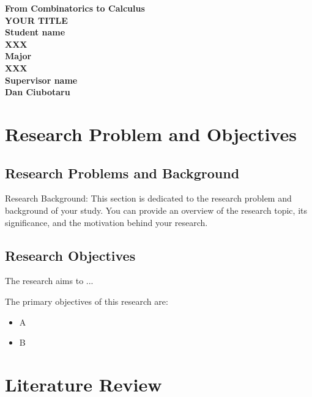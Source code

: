 \documentclass[12pt]{article}
\begin{document}
\begin{titlepage}
    \begin{center}
        \vspace*{3cm}

        \textbf{\Large From Combinatorics to Calculus}\\[2.5cm]

        \textbf{\Large YOUR TITLE}\\[2.5cm]

        \textbf{\large Student name}\\[0.5cm]
        \textbf{XXX}\\[2cm]

        \textbf{\large Major}\\[0.5cm]
        \textbf{XXX}\\[2cm]

        \textbf{\large Supervisor name}\\[0.5cm]
        \textbf{Dan Ciubotaru}\\[3cm]
    \end{center}
\end{titlepage}

\section{Research Problem and Objectives}
\subsection{Research Problems and Background}

Research Background: This section is dedicated to the research problem and background of your study. You can provide an overview of the research topic, its significance, and the motivation behind your research.

\subsection{Research Objectives}

The research aims to ...

The primary objectives of this research are:

\begin{itemize}
    \item A
    \item B
\end{itemize}

\section{Literature Review}
\end{document}
